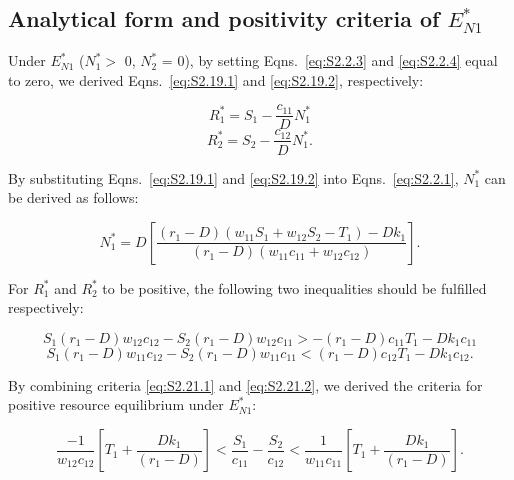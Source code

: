 \subsection*{Analytical form and positivity criteria of $E_{N1}^{*}$} 
Under \textbf{$E_{N1}^{*}$} ($N_{1}^{*} >$  0, $N_{2}^{*}$ = 0), by setting Eqns.~\ref{eq:S2.2.3} and \ref{eq:S2.2.4} equal to zero, we derived Eqns.~\ref{eq:S2.19.1} and \ref{eq:S2.19.2}, respectively:

\begin{equation}
R_{1}^{*} = S_1-\frac{c_{11}}{D}N_{1}^{*}
\tag{S2.19.1}\label{eq:S2.19.1}
\end{equation}
\begin{equation}
R_{2}^{*} = S_2-\frac{c_{12}}{D}N_{1}^{*}.
\tag{S2.19.2}\label{eq:S2.19.2}
\end{equation}

\noindent By substituting Eqns.~\ref{eq:S2.19.1} and \ref{eq:S2.19.2} into Eqns.~\ref{eq:S2.2.1}, $N_{1}^{*}$ can be derived as follows:

\begin{equation}
N_{1}^{*} = D\left [\frac{\left ( r_1 - D\right )\left ( w_{11}S_{1}+w_{12}S_{2}-T_{1} \right )-Dk_{1}}{\left ( r_1-D \right )\left (  w_{11}c_{11}+w_{12}c_{12} \right )}\right].
\tag{S2.20}\label{eq:S2.20}
\end{equation}

\noindent For $R_{1}^{*}$ and $R_{2}^{*}$ to be positive, the following two inequalities should be fulfilled respectively:

\begin{equation}
S_1\left ( r_{1}-D \right )w_{12}c_{12} - S_2\left ( r_1-D \right )w_{12}c_{11} > -\left ( r_{1}-D \right )c_{11}T_{1} - Dk_{1}c_{11}
\tag{S2.21.1}\label{eq:S2.21.1}
\end{equation}
\begin{equation}
S_1\left ( r_{1}-D \right )w_{11}c_{12} - S_2\left ( r_1-D \right )w_{11}c_{11} < \left ( r_{1}-D \right )c_{12}T_{1} - Dk_{1}c_{12}.
\tag{S2.21.2}\label{eq:S2.21.2}
\end{equation}

By combining criteria \ref{eq:S2.21.1} and \ref{eq:S2.21.2}, we derived the criteria for positive resource equilibrium under $E_{N1}^{*}$:

\begin{equation}
\frac{-1}{w_{12}c_{12}}\left [ T_{1} + \frac{Dk_{1}}{\left ( r_{1}-D \right )}\right ] < \frac{S_1}{c_{11}}-\frac{S_2}{c_{12}} < \frac{1}{w_{11}c_{11}}\left [ T_{1} + \frac{Dk_{1}}{\left ( r_{1}-D \right )}\right ].
\tag{S2.22}\label{eq:S2.22}
\end{equation}



